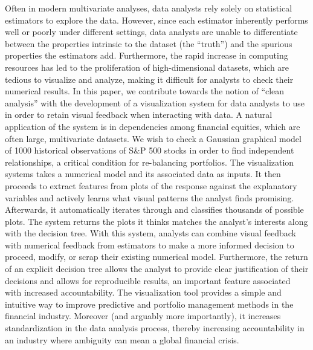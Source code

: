 Often in modern multivariate analyses, data analysts rely solely on statistical
estimators to explore the data. However, since each estimator inherently
performs well or poorly under different settings, data analysts are unable to
differentiate between the properties intrinsic to the dataset (the “truth”) and
the spurious properties the estimators add. Furthermore, the rapid increase in
computing resources has led to the proliferation of high-dimensional datasets,
which are tedious to visualize and analyze, making it difficult for analysts to
check their numerical results. In this paper, we contribute towards the notion
of “clean analysis” with the development of a visualization system for data
analysts to use in order to retain visual feedback when interacting with data. A
natural application of the system is in dependencies among financial equities,
which are often large, multivariate datasets. We wish to check a Gaussian
graphical model of 1000 historical observations of S\&P 500 stocks in order to
find independent relationships, a critical condition for re-balancing
portfolios. The visualization systems takes a numerical model and its associated
data as inputs. It then proceeds to extract features from plots of the response
against the explanatory variables and actively learns what visual patterns the
analyst finds promising. Afterwards, it automatically iterates through and
classifies thousands of possible plots. The system returns the plots it thinks
matches the analyst’s interests along with the decision tree. With this system,
analysts can combine visual feedback with numerical feedback from estimators to
make a more informed decision to proceed, modify, or scrap their existing
numerical model. Furthermore, the return of an explicit decision tree allows the
analyst to provide clear justification of their decisions and allows for
reproducible results, an important feature associated with increased
accountability. The visualization tool provides a simple and intuitive way to
improve predictive and portfolio management methods in the financial industry.
Moreover (and arguably more importantly), it increases standardization in the
data analysis process, thereby increasing accountability in an industry where
ambiguity can mean a global financial crisis.
